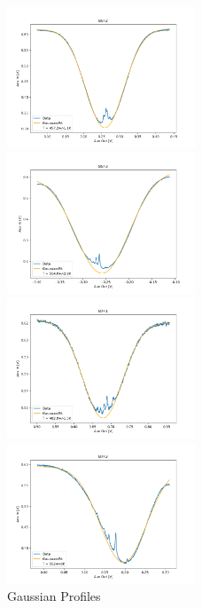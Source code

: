 \documentclass[12pt, a4paper]{article}
\begin{document}
\begin{figure}
    \centering
    \parbox{0.45\textwidth}{
        \includegraphics[width=0.5\textwidth]{gaussian1.png}
    }
    \hfill
    \parbox{0.45\textwidth}{
        \includegraphics[width=0.5\textwidth]{gaussian2.png}
    }
    \parbox{0.45\textwidth}{
        \includegraphics[width=0.5\textwidth]{gaussian3.png}
    }
    \hfill
    \parbox{0.45\textwidth}{
        \includegraphics[width=0.5\textwidth]{gaussian4.png}
    }
    \caption{Gaussian Profiles}
    \label{gaussianprofiles}
\end{figure}
\end{document}
